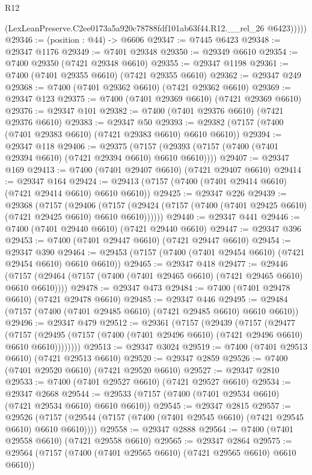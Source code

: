 \begin{lexlean}{R12}
\begin{coremodule}
            (LexLeanPreserve.C2ee0173a5a920c78788fdf101ab63f44.R12.__rel_26 @6423)))))
@29346 := (position : @44) -> @6606
@29347 := @7445 @6423
@29348 := @29347 @1176
@29349 := @7401 @29348
@29350 := @29349 @6610
@29354 := @7400 @29350 (@7421 @29348 @6610)
@29355 := @29347 @1198
@29361 := @7400 (@7401 @29355 @6610) (@7421 @29355 @6610)
@29362 := @29347 @249
@29368 := @7400 (@7401 @29362 @6610) (@7421 @29362 @6610)
@29369 := @29347 @123
@29375 := @7400 (@7401 @29369 @6610) (@7421 @29369 @6610)
@29376 := @29347 @101
@29382 := @7400 (@7401 @29376 @6610) (@7421 @29376 @6610)
@29383 := @29347 @50
@29393 := @29382 (@7157 (@7400 (@7401 @29383 @6610) (@7421 @29383 @6610) @6610 @6610))
@29394 := @29347 @118
@29406 := @29375
    (@7157 (@29393 (@7157 (@7400 (@7401 @29394 @6610) (@7421 @29394 @6610) @6610 @6610))))
@29407 := @29347 @169
@29413 := @7400 (@7401 @29407 @6610) (@7421 @29407 @6610)
@29414 := @29347 @164
@29424 := @29413 (@7157 (@7400 (@7401 @29414 @6610) (@7421 @29414 @6610) @6610 @6610))
@29425 := @29347 @226
@29439 := @29368
    (@7157
      (@29406
        (@7157 (@29424 (@7157 (@7400 (@7401 @29425 @6610) (@7421 @29425 @6610) @6610 @6610))))))
@29440 := @29347 @441
@29446 := @7400 (@7401 @29440 @6610) (@7421 @29440 @6610)
@29447 := @29347 @396
@29453 := @7400 (@7401 @29447 @6610) (@7421 @29447 @6610)
@29454 := @29347 @390
@29464 := @29453 (@7157 (@7400 (@7401 @29454 @6610) (@7421 @29454 @6610) @6610 @6610))
@29465 := @29347 @418
@29477 := @29446
    (@7157 (@29464 (@7157 (@7400 (@7401 @29465 @6610) (@7421 @29465 @6610) @6610 @6610))))
@29478 := @29347 @473
@29484 := @7400 (@7401 @29478 @6610) (@7421 @29478 @6610)
@29485 := @29347 @446
@29495 := @29484 (@7157 (@7400 (@7401 @29485 @6610) (@7421 @29485 @6610) @6610 @6610))
@29496 := @29347 @479
@29512 := @29361
    (@7157
      (@29439
        (@7157
          (@29477
            (@7157
              (@29495 (@7157 (@7400 (@7401 @29496 @6610) (@7421 @29496 @6610) @6610 @6610))))))))
@29513 := @29347 @3024
@29519 := @7400 (@7401 @29513 @6610) (@7421 @29513 @6610)
@29520 := @29347 @2859
@29526 := @7400 (@7401 @29520 @6610) (@7421 @29520 @6610)
@29527 := @29347 @2810
@29533 := @7400 (@7401 @29527 @6610) (@7421 @29527 @6610)
@29534 := @29347 @2668
@29544 := @29533 (@7157 (@7400 (@7401 @29534 @6610) (@7421 @29534 @6610) @6610 @6610))
@29545 := @29347 @2815
@29557 := @29526
    (@7157 (@29544 (@7157 (@7400 (@7401 @29545 @6610) (@7421 @29545 @6610) @6610 @6610))))
@29558 := @29347 @2888
@29564 := @7400 (@7401 @29558 @6610) (@7421 @29558 @6610)
@29565 := @29347 @2864
@29575 := @29564 (@7157 (@7400 (@7401 @29565 @6610) (@7421 @29565 @6610) @6610 @6610))

\end{coremodule}
\end{lexlean}
